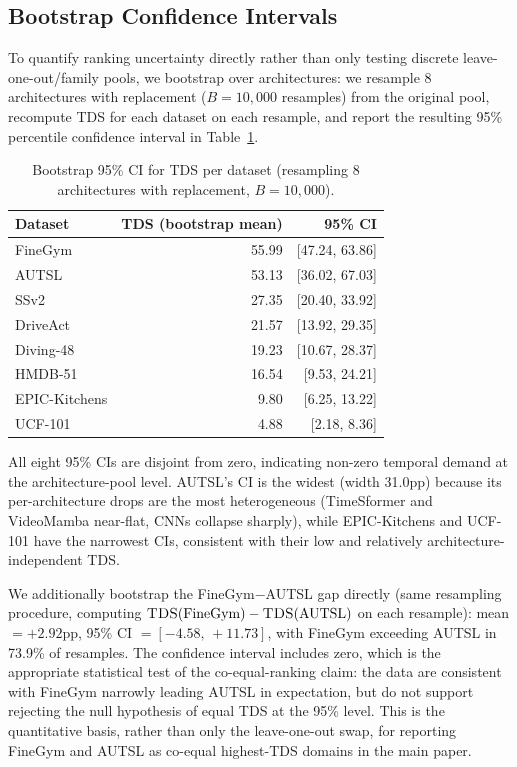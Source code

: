 \documentclass[runningheads]{llncs}
\newcommand{\tabtight}{\setlength{\tabcolsep}{3.5pt}\renewcommand{\arraystretch}{1.12}}
\newcommand{\TDS}{\textsc{TDS}}
\begin{document}
\subsection{Bootstrap Confidence Intervals}
\label{sec:sup_bootstrap}

To quantify ranking uncertainty directly rather than only testing discrete leave-one-out/family pools, we bootstrap over architectures: we resample 8 architectures with replacement ($B{=}10{,}000$ resamples) from the original pool, recompute \TDS{} for each dataset on each resample, and report the resulting 95\% percentile confidence interval in Table~\ref{tab:bootstrap_ci}.

\begin{table}[!htbp]
\centering
\caption{Bootstrap 95\% CI for \TDS{} per dataset (resampling 8 architectures with replacement, $B{=}10{,}000$).}
\label{tab:bootstrap_ci}
\scriptsize\tabtight
\begin{tabular}{l r r}
\toprule
Dataset & \TDS{} (bootstrap mean) & 95\% CI \\
\midrule
FineGym       & 55.99 & [47.24, 63.86] \\
AUTSL         & 53.13 & [36.02, 67.03] \\
SSv2          & 27.35 & [20.40, 33.92] \\
DriveAct      & 21.57 & [13.92, 29.35] \\
Diving-48     & 19.23 & [10.67, 28.37] \\
HMDB-51       & 16.54 & [9.53, 24.21] \\
EPIC-Kitchens &  9.80 & [6.25, 13.22] \\
UCF-101       &  4.88 & [2.18, 8.36] \\
\bottomrule
\end{tabular}
\end{table}

All eight 95\% CIs are disjoint from zero, indicating non-zero temporal demand at the architecture-pool level. AUTSL's CI is the widest (width 31.0pp) because its per-architecture drops are the most heterogeneous (TimeSformer and VideoMamba near-flat, CNNs collapse sharply), while EPIC-Kitchens and UCF-101 have the narrowest CIs, consistent with their low and relatively architecture-independent \TDS{}.

We additionally bootstrap the FineGym$-$AUTSL gap directly (same resampling procedure, computing $\TDS(\text{FineGym})-\TDS(\text{AUTSL})$ on each resample): mean $=+2.92$pp, 95\% CI $=[-4.58,\,+11.73]$, with FineGym exceeding AUTSL in 73.9\% of resamples. The confidence interval includes zero, which is the appropriate statistical test of the co-equal-ranking claim: the data are consistent with FineGym narrowly leading AUTSL in expectation, but do not support rejecting the null hypothesis of equal \TDS{} at the 95\% level. This is the quantitative basis, rather than only the leave-one-out swap, for reporting FineGym and AUTSL as co-equal highest-\TDS{} domains in the main paper.
\end{document}
